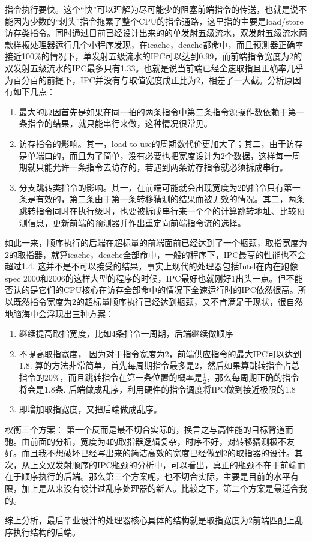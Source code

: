 \documentclass[11pt]{article}
\begin{document}
\begin{enumerate}
	指令执行要快。这个``快''可以理解为尽可能少的阻塞前端指令的传送，也就是说不能因为少数的``刺头''指令拖累了整个CPU的指令通路，这里指的主要是load/store访存类指令。同时通过目前已经设计出来的的单发射五级流水，双发射五级流水两款样板处理器运行几个小程序发现，在icache，dcache都命中，而且预测器正确率接近100\%的情况下，单发射五级流水的IPC可以达到0.99，而前端指令宽度为2的双发射五级流水的IPC最多只有1.33。也就是说当前端已经全速取指且正确率几乎为百分百的前提下，IPC并没有与取值宽度成正比为2，相差了一大截。分析原因有如下几点：
	\begin{enumerate}
		\item 最大的原因首先是如果在同一拍的两条指令中第二条指令源操作数依赖于第一条指令的结果，就只能串行来做，这种情况很常见。
		\item 访存指令的影响。其一，load to use的周期数代价更加大了；其二，由于访存是单端口的，而且为了简单，没有必要也把宽度设计为2个数据，这样每一周期就只能允许一条指令去访存的，若遇到两条访存指令就必须拆成串行。
		\item 分支跳转类指令的影响。其一，在前端可能就会出现宽度为2的指令只有第一条是有效的，第二条由于第一条转移猜测的结果而被无效的情况。其二，两条跳转指令同时在执行级时，也要被拆成串行来一个个的计算跳转地址、比较预测信息，更新前端的预测器并作出重定向前端指令流的选择。
	\end{enumerate}
	如此一来，顺序执行的后端在超标量的前端面前已经达到了一个瓶颈，取指宽度为2的取指器，就算icache，dcache全部命中，一般的程序下，IPC最高的性能也不会超过1.4. 这并不是不可以接受的结果，事实上现代的处理器包括Intel在内在跑像spec 2000和2006的这样大型的程序的时候，IPC最好也就刚好1出头一点。但不能否认的是它们的CPU核心在访存全部命中的情况下全速运行时的IPC依然很高。所以既然指令宽度为2的超标量顺序执行已经达到瓶颈，又不肯满足于现状，很自然地脑海中会浮现出三种方案：
	\begin{enumerate}
		\item 继续提高取指宽度，比如4条指令一周期，后端继续做顺序
		\item 不提高取指宽度， 因为对于指令宽度为2，前端供应指令的最大IPC可以达到1.8. 算的方法非常简单，首先每周期指令最多是2，然后如果算跳转指令占总指令的20\%，而且跳转指令在第一条位置的概率是$\frac{1}{2}$，那么每周期正确的指令将会是1.8条. 后端做成乱序，利用硬件的指令调度将IPC做到接近极限的1.8
		\item 即增加取指宽度，又把后端做成乱序。
	\end{enumerate}
	权衡三个方案： 第一个反而是最不切合实际的，换言之与高性能的目标背道而驰。由前面的分析，宽度为4的取指器逻辑复杂，时序不好，对转移猜测极不友好。而且我不想破坏已经写出来的简洁高效的宽度已经做到2的取指器的设计。其次，从上文双发射顺序的IPC瓶颈的分析中，可以看出，真正的瓶颈不在于前端而在于顺序执行的后端。那么第三个方案呢，也不切合实际，主要是目前的水平有限，加上是从来没有设计过乱序处理器的新人。比较之下，第二个方案是最适合我的。
\end{enumerate}
综上分析，最后毕业设计的处理器核心具体的结构就是取指宽度为2前端匹配上乱序执行结构的后端。
\end{document}
